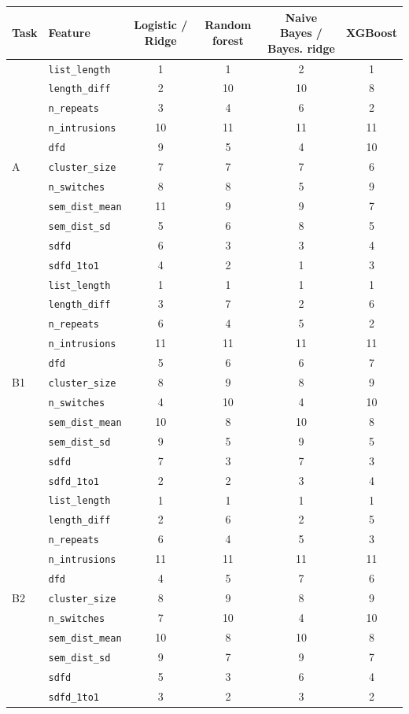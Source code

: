 \begin{tabular}{llcccc}
\toprule
Task & Feature & Logistic / Ridge & Random forest & Naive Bayes / Bayes. ridge & XGBoost \\
\midrule
\multirow{11}{*}{A} & \texttt{list\_length} & 1 & 1 & 2 & 1 \\
 & \texttt{length\_diff} & 2 & 10 & 10 & 8 \\
 & \texttt{n\_repeats} & 3 & 4 & 6 & 2 \\
 & \texttt{n\_intrusions} & 10 & 11 & 11 & 11 \\
 & \texttt{dfd} & 9 & 5 & 4 & 10 \\
 & \texttt{cluster\_size} & 7 & 7 & 7 & 6 \\
 & \texttt{n\_switches} & 8 & 8 & 5 & 9 \\
 & \texttt{sem\_dist\_mean} & 11 & 9 & 9 & 7 \\
 & \texttt{sem\_dist\_sd} & 5 & 6 & 8 & 5 \\
 & \texttt{sdfd} & 6 & 3 & 3 & 4 \\
 & \texttt{sdfd\_1to1} & 4 & 2 & 1 & 3 \\
\midrule
\multirow{11}{*}{B1} & \texttt{list\_length} & 1 & 1 & 1 & 1 \\
 & \texttt{length\_diff} & 3 & 7 & 2 & 6 \\
 & \texttt{n\_repeats} & 6 & 4 & 5 & 2 \\
 & \texttt{n\_intrusions} & 11 & 11 & 11 & 11 \\
 & \texttt{dfd} & 5 & 6 & 6 & 7 \\
 & \texttt{cluster\_size} & 8 & 9 & 8 & 9 \\
 & \texttt{n\_switches} & 4 & 10 & 4 & 10 \\
 & \texttt{sem\_dist\_mean} & 10 & 8 & 10 & 8 \\
 & \texttt{sem\_dist\_sd} & 9 & 5 & 9 & 5 \\
 & \texttt{sdfd} & 7 & 3 & 7 & 3 \\
 & \texttt{sdfd\_1to1} & 2 & 2 & 3 & 4 \\
\midrule
\multirow{11}{*}{B2} & \texttt{list\_length} & 1 & 1 & 1 & 1 \\
 & \texttt{length\_diff} & 2 & 6 & 2 & 5 \\
 & \texttt{n\_repeats} & 6 & 4 & 5 & 3 \\
 & \texttt{n\_intrusions} & 11 & 11 & 11 & 11 \\
 & \texttt{dfd} & 4 & 5 & 7 & 6 \\
 & \texttt{cluster\_size} & 8 & 9 & 8 & 9 \\
 & \texttt{n\_switches} & 7 & 10 & 4 & 10 \\
 & \texttt{sem\_dist\_mean} & 10 & 8 & 10 & 8 \\
 & \texttt{sem\_dist\_sd} & 9 & 7 & 9 & 7 \\
 & \texttt{sdfd} & 5 & 3 & 6 & 4 \\
 & \texttt{sdfd\_1to1} & 3 & 2 & 3 & 2 \\

\bottomrule
\end{tabular}